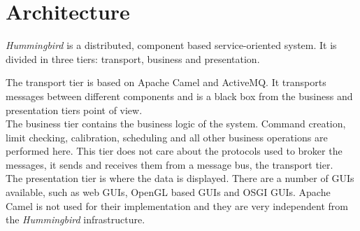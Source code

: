 \section{Architecture}

\emph{Hummingbird} is a distributed, component based service-oriented system. It is divided in three tiers: transport, business and presentation.

The transport tier is based on Apache Camel and ActiveMQ. It transports messages between different components  and is a black box from the business and presentation tiers point of view.\\

The business tier contains the business logic of the system. Command creation, limit checking, calibration, scheduling and all other business operations are performed here. This tier does not care about the protocols used to broker the messages, it sends and receives them from a message bus, the transport tier.\\

The presentation tier is where the data is displayed. There are a number of GUIs available, such as web GUIs, OpenGL based GUIs and OSGI GUIs. Apache Camel is not used for their implementation and they are very independent from the \emph{Hummingbird} infrastructure.

 

\newpage